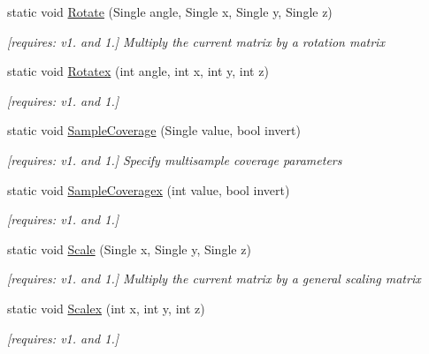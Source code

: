 \begin{DoxyCompactItemize}
static void \hyperlink{class_open_t_k_1_1_graphics_1_1_e_s10_1_1_g_l_a83f3e0d2f151083df3faae4f6f757728}{Rotate} (Single angle, Single x, Single y, Single z)
\begin{DoxyCompactList}\small\item\em \mbox{[}requires\-: v1. and 1.\mbox{]} Multiply the current matrix by a rotation matrix \end{DoxyCompactList}\item 
static void \hyperlink{class_open_t_k_1_1_graphics_1_1_e_s10_1_1_g_l_a719f5b136ac81a9bafaa02632d2fdfb3}{Rotatex} (int angle, int x, int y, int z)
\begin{DoxyCompactList}\small\item\em \mbox{[}requires\-: v1. and 1.\mbox{]}\end{DoxyCompactList}\item 
static void \hyperlink{class_open_t_k_1_1_graphics_1_1_e_s10_1_1_g_l_a02ed0f01033668449f7937387828070c}{Sample\-Coverage} (Single value, bool invert)
\begin{DoxyCompactList}\small\item\em \mbox{[}requires\-: v1. and 1.\mbox{]} Specify multisample coverage parameters \end{DoxyCompactList}\item 
static void \hyperlink{class_open_t_k_1_1_graphics_1_1_e_s10_1_1_g_l_ade52203b8228bc61acdeddd72584bd79}{Sample\-Coveragex} (int value, bool invert)
\begin{DoxyCompactList}\small\item\em \mbox{[}requires\-: v1. and 1.\mbox{]}\end{DoxyCompactList}\item 
static void \hyperlink{class_open_t_k_1_1_graphics_1_1_e_s10_1_1_g_l_a22fd962bf6b401c51ced1b07d57ed5a3}{Scale} (Single x, Single y, Single z)
\begin{DoxyCompactList}\small\item\em \mbox{[}requires\-: v1. and 1.\mbox{]} Multiply the current matrix by a general scaling matrix \end{DoxyCompactList}\item 
static void \hyperlink{class_open_t_k_1_1_graphics_1_1_e_s10_1_1_g_l_a7b01e912524ba825a34894d3c34ac6aa}{Scalex} (int x, int y, int z)
\begin{DoxyCompactList}\small\item\em \mbox{[}requires\-: v1. and 1.\mbox{]}\end{DoxyCompactList}\item 

\end{DoxyCompactItemize}
